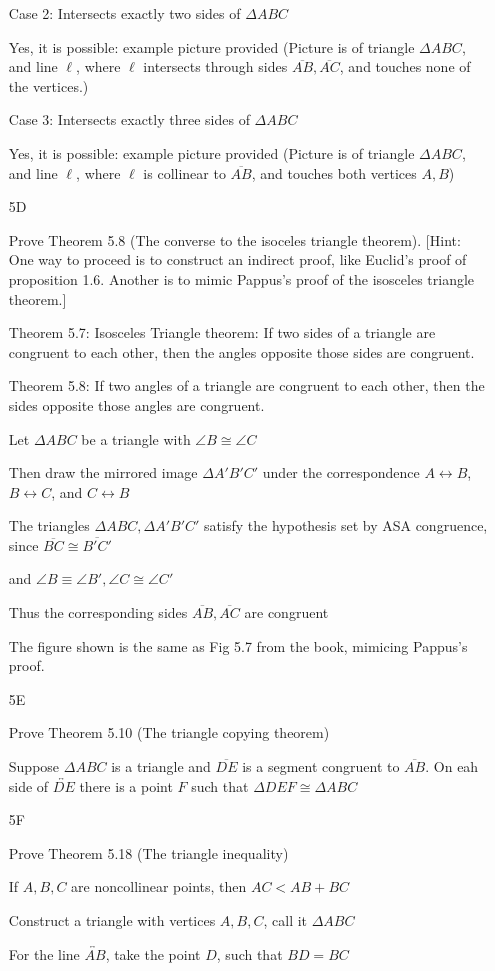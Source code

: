 \documentclass[11pt]{article}
\newcommand{\lines}[1]{\overleftrightarrow{#1}}
\newcommand{\segment}[1]{\overline{#1}}
\begin{document}
\begin{itemize}
		Case 2: Intersects exactly two sides of $\Delta ABC$

		Yes, it is possible: example picture provided (Picture is of triangle $\Delta ABC$, and line $\ell$, where $\ell$  intersects through sides $\segment{AB}, \segment{AC}$, and touches none of the vertices.)

		Case 3: Intersects exactly three sides of $\Delta ABC$

		Yes, it is possible: example picture provided (Picture is of triangle $\Delta ABC$, and line $\ell$, where $\ell$ is collinear to $\segment{AB}$, and touches both vertices $A,B$)

	\item[5D]

		Prove Theorem 5.8 (The converse to the isoceles triangle theorem). [Hint: One way to proceed is to construct an indirect proof, like Euclid's proof of proposition 1.6. Another is to mimic Pappus's proof of the isosceles triangle theorem.]

		Theorem 5.7: Isosceles Triangle theorem: If two sides of a triangle are congruent to each other, then the angles opposite those sides are congruent.

		Theorem 5.8: If two angles of a triangle are congruent to each other, then the sides opposite those angles are congruent.

		Let $\Delta ABC$ be a triangle with $\angle B \cong \angle C$

		Then draw the mirrored image $\Delta A' B' C'$ under the correspondence $A \leftrightarrow B$, $B \leftrightarrow C$, and $C \leftrightarrow B$

		The triangles $\Delta ABC, \Delta A'B'C'$ satisfy the hypothesis set by ASA congruence, since $\segment{BC} \cong \segment{B'C'}$

		and $\angle B \equiv \angle B', \angle C \cong \angle C'$

		Thus the corresponding sides $\segment{AB}, \segment{AC}$ are congruent

		The figure shown is the same as Fig 5.7 from the book, mimicing Pappus's proof. 

	\item[5E]

		Prove Theorem 5.10 (The triangle copying theorem)

		Suppose $\Delta ABC$ is a triangle and $\segment{DE}$ is a segment congruent to $\segment{AB}$. On eah side of $\lines{DE}$ there is a point $F$ such that $\Delta DEF \cong \Delta ABC$


	\item[5F]

		Prove Theorem 5.18 (The triangle inequality)

		If $A,B,C$ are noncollinear points, then $AC < AB + BC$

		Construct a triangle with vertices $A,B,C$, call it $\Delta ABC$

		For the line $\lines{AB}$, take the point $D$, such that $BD = BC$


			
\end{itemize}
\end{document}
